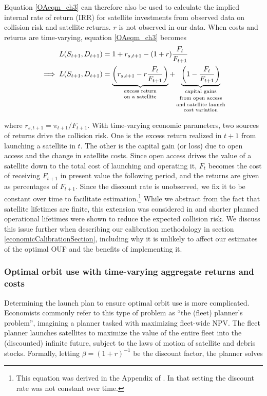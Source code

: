 \documentclass[9pt,twoside,lineno]{pnas-new}
\begin{document}
Equation \ref{OAeqm_ch3} can therefore also be used to calculate the implied internal rate of return (IRR) for satellite investments from observed data on collision risk and satellite returns. $r$ is not observed in our data. When costs and returns are time-varying, equation \ref{OAeqm_ch3} becomes
\begin{align}
\label{OAeqm_ch3_2}
L(S_{t+1},D_{t+1}) &= 1+ r_{s,t+1} - (1+r) \frac{F_t}{F_{t+1}} \\
\implies L(S_{t+1},D_{t+1}) &= \underbrace{\left( r_{s,t+1} - r \frac{F_t}{F_{t+1}} \right)}_{\text{\shortstack{excess return\\on a satellite}}} + \underbrace{\left(1 - \frac{F_t}{F_{t+1}} \right)}_{\text{\shortstack{capital gains\\from open access\\and satellite launch\\cost variation}}} \nonumber
\end{align}

where $r_{s,t+1} = \pi_{t+1}/F_{t+1}$. With time-varying economic parameters, two sources of returns drive the collision risk. One is the excess return realized in $t+1$ from launching a satellite in $t$. The other is the capital gain (or loss) due to open access and the change in satellite costs. Since open access drives the value of a satellite down to the total cost of launching and operating it, $F_t$ becomes the cost of receiving $F_{t+1}$ in present value the following period, and the returns are given as percentages of $F_{t+1}$. Since the discount rate is unobserved, we fix it to be constant over time to facilitate estimation.\footnote{This equation was derived in the Appendix of \cite{rao2019diss}. In that setting the discount rate was not constant over time.} While we abstract from the fact that satellite lifetimes are finite, this extension was considered in \cite{rao2019diss} and shorter planned operational lifetimes were shown to reduce the expected collision risk. We discuss this issue further when describing our calibration methodology in section \ref{economicCalibrationSection}, including why it is unlikely to affect our estimates of the optimal OUF and the benefits of implementing it.

\subsubsection{Optimal orbit use with time-varying aggregate returns and costs}

Determining the launch plan to ensure optimal orbit use is more complicated. Economists commonly refer to this type of problem as ``the (fleet) planner's problem'', imagining a planner tasked with maximizing fleet-wide NPV. The fleet planner launches satellites to maximize the value of the entire fleet into the (discounted) infinite future, subject to the laws of motion of satellite and debris stocks. Formally, letting $\beta = (1+r)^{-1}$ be the discount factor, the planner solves
\end{document}
